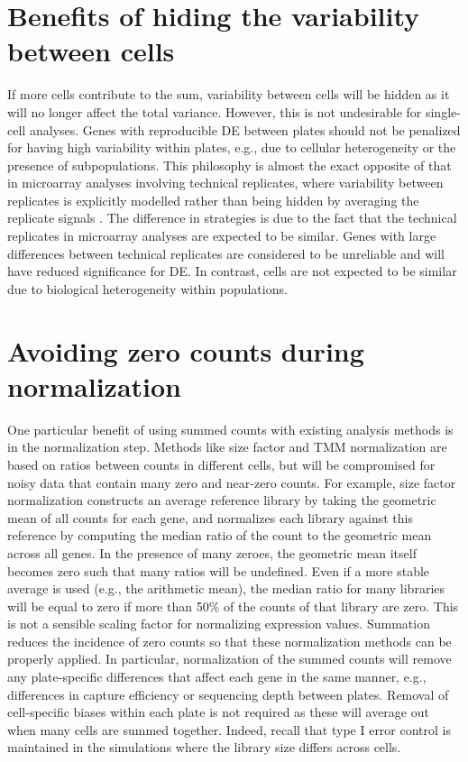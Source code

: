 \documentclass{article}
\begin{document}

\section{Benefits of hiding the variability between cells}
If more cells contribute to the sum, variability between cells will be hidden as it will no longer affect the total variance.
However, this is not undesirable for single-cell analyses.
Genes with reproducible DE between plates should not be penalized for having high variability within plates, e.g., due to cellular heterogeneity or the presence of subpopulations.
This philosophy is almost the exact opposite of that in microarray analyses involving technical replicates,
    where variability between replicates is explicitly modelled rather than being hidden by averaging the replicate signals \citep{smyth2005use}.
The difference in strategies is due to the fact that the technical replicates in microarray analyses are expected to be similar.
Genes with large differences between technical replicates are considered to be unreliable and will have reduced significance for DE.
In contrast, cells are not expected to be similar due to biological heterogeneity within populations.

\section{Avoiding zero counts during normalization}
One particular benefit of using summed counts with existing analysis methods is in the normalization step.
Methods like size factor and TMM normalization are based on ratios between counts in different cells,
    but will be compromised for noisy data that contain many zero and near-zero counts.
For example, size factor normalization constructs an average reference library by taking the geometric mean of all counts for each gene, 
    and normalizes each library against this reference by computing the median ratio of the count to the geometric mean across all genes.
In the presence of many zeroes, the geometric mean itself becomes zero such that many ratios will be undefined.
Even if a more stable average is used (e.g., the arithmetic mean), the median ratio for many libraries will be equal to zero if more than 50\% of the counts of that library are zero.
This is not a sensible scaling factor for normalizing expression values.
Summation reduces the incidence of zero counts so that these normalization methods can be properly applied.
In particular, normalization of the summed counts will remove any plate-specific differences that affect each gene in the same manner, 
    e.g., differences in capture efficiency or sequencing depth between plates.
Removal of cell-specific biases within each plate is not required as these will average out when many cells are summed together.
Indeed, recall that type I error control is maintained in the simulations where the library size differs across cells.
\end{document}
